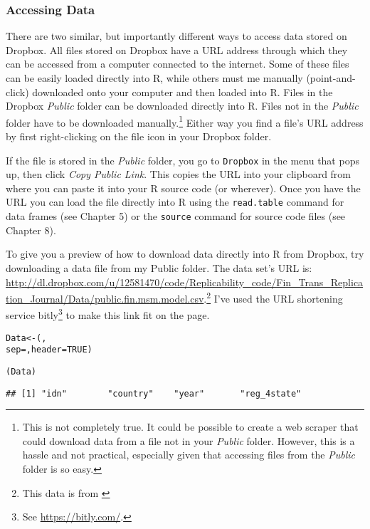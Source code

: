 \subsubsection{Accessing Data}

There are two similar, but importantly different ways to access data stored on Dropbox. All files stored on Dropbox have a URL address through which they can be accessed from a computer connected to the internet. Some of these files can be easily loaded directly into R, while others must me manually (point-and-click) downloaded onto your computer and then loaded into R. Files in the Dropbox \emph{Public} folder can be downloaded directly into R. Files not in the \emph{Public} folder have to be downloaded  manually.\footnote{This is not completely true. It could be possible to create a web scraper that could download data from a file not in your \emph{Public} folder. However, this is a hassle and not practical, especially given that accessing files from the \emph{Public} folder is so easy.} Either way you find a file's URL address by first right-clicking on the file icon in your Dropbox folder. 

If the file is stored in the \emph{Public} folder, you go to \texttt{Dropbox} in the menu that pops up, then click \emph{Copy Public Link}. This copies the URL into your clipboard from where you can paste it into your R source code (or wherever). Once you have the URL you can load the file directly into R using the \texttt{read.table} command for data frames (see Chapter 5) or the \texttt{source} command for source code files (see Chapter 8).

To give you a preview of how to download data directly into R from Dropbox, try downloading a data file from my Public folder. The data set's URL is: \url{http://dl.dropbox.com/u/12581470/code/Replicability_code/Fin_Trans_Replication_Journal/Data/public.fin.msm.model.csv}.\footnote{This data is from \cite{Gandrud2012}} I've used the URL shortening service bitly\footnote{See \url{https://bitly.com/}.} to make this link fit on the page.

\begin{knitrout}
\color{fgcolor}\begin{kframe}
\begin{alltt}
Data <- (, 
                    sep = , header = TRUE)
                    
(Data)
\end{alltt}
\begin{verbatim}
## [1] "idn"        "country"    "year"       "reg_4state"
\end{verbatim}
\end{kframe}
\end{knitrout}


